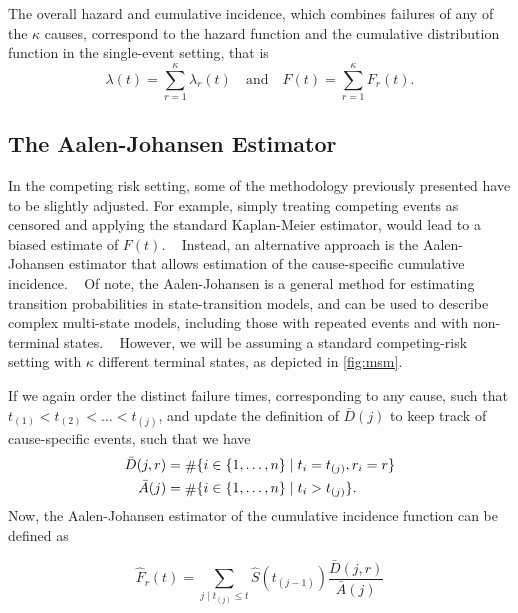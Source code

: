 The overall hazard and cumulative incidence, 
which combines failures of any of the \(\kappa\) causes,
correspond to the hazard function 
and the cumulative distribution function 
in the single-event setting, that is
\begin{equation}
    \lambda(t) = \sum_{r=1}^{\kappa} \lambda_r(t)
    \quad \text{and} \quad
    F(t) = \sum_{r=1}^{\kappa} F_r(t).
\end{equation}

\subsection{The Aalen-Johansen Estimator}

In the competing risk setting, 
some of the methodology previously presented
have to be slightly adjusted.
For example, 
simply treating competing events as censored 
and applying the standard Kaplan-Meier estimator, 
would lead to a biased estimate of \(F(t)\).
~\autocite{pepeKaplan1993}
Instead, an alternative approach is the Aalen-Johansen estimator
that allows estimation of the cause-specific cumulative incidence.
~\autocite{aalenEmpirical1978}
Of note, the Aalen-Johansen is a general method for estimating
transition probabilities in state-transition models,
and can be used to describe complex multi-state models,
including those with repeated events and with non-terminal states.
~\autocite{survival-package}
However, we will be assuming a standard competing-risk setting
with \(\kappa\) different terminal states, 
as depicted in \cref{fig:msm}.
 
If we again order the distinct failure times, 
corresponding to any cause, 
such that
\(t_{(1)} < t_{(2)} < \ldots < t_{(j)}\),
and update the definition of \(\bar{D}(j)\) to keep track of cause-specific
events, such that we have
\begin{equation}
\begin{aligned}
    \bar{D}(j, r) &= \card \{i \in \{1, \dots, n\} \mid t_i = t_{(j)}, r_i = r\} \\
    \bar{A}(j)    &= \card \{i \in \{1, \dots, n\} \mid t_i > t_{(j)}\}.
\end{aligned}
\end{equation}
Now, the Aalen-Johansen estimator of the cumulative incidence function
can be defined as 

\begin{equation}
    \widehat{F}_r(t)
    =   \sum_{j \mid t_{(j)} \leq t}{
        \!\!
        \widehat{S}(t_{(j-1)})
        \frac{\bar{D}(j, r)}{\bar{A}(j)}
    }
\end{equation}


